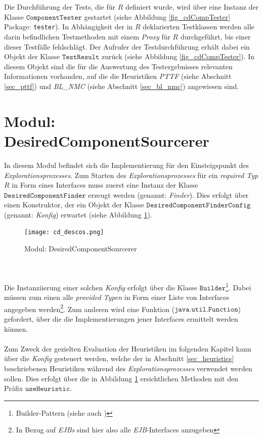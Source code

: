 \\\\
Die Durchführung der Tests, die für $R$ definiert wurde, wird über eine Instanz der Klasse $\texttt{ComponentTester}$ gestartet (siehe Abbildung \ref{fig_cdCompTester} Package: \texttt{tester}). In Abhängigkeit der in $R$ deklarierten Testklassen werden alle darin befindlichen Testmethoden mit einem \emph{Proxy} für $R$ durchgeführt, bis einer dieser Testfälle fehlschlägt. Der Aufrufer der Testdurchführung erhält dabei ein Objekt der Klasse $\texttt{TestResult}$ zurück (siehe Abbildung \ref{fig_cdCompTester}). In diesem Objekt sind die für die Auswertung des Testergebnisses relevanten Informationen vorhanden, auf die die Heuristiken \emph{PTTF} (siehe Abschnitt \ref{sec_pttf}) und \emph{BL\_NMC} (siehe Abschnitt \ref{sec_bl_nmc}) angewiesen sind.
\section{Modul: DesiredComponentSourcerer}\label{sec_impl_descos}
In diesem \Gls{Modul} befindet sich die Implementierung für den Einsteigspunkt des \emph{Explorationsprozesses}. Zum Starten des \emph{Explorationsprozesses} für ein \emph{required Typ} $R$ in Form eines \Gls{Interface}s muss zuerst eine Instanz der Klasse $\texttt{DesiredComponentFinder}$ erzeugt werden (genannt: \emph{Finder}). Dies erfolgt über einen Konstruktor, der ein Objekt der Klasse \linebreak$\texttt{DesiredComponentFinderConfig}$ (genannt: \emph{Konfig}) erwartet (siehe Abbildung \ref{cd_descos}). 
\begin{figure}[h!]
\centering
\texttt{[image: cd\_descos.png]}
\caption{Modul: DesiredComponentSourcerer}
\label{cd_descos}
\end{figure}
\noindent
\\\\
Die Instanziierung einer solchen \emph{Konfig} erfolgt über die Klasse $\texttt{Builder}$\footnote{Builder-Pattern (siehe auch \cite{patterns})}. Dabei müssen zum einen alle  \emph{provided Typen} in Form einer Liste von \Gls{Interface}s angegeben werden\footnote{In Bezug auf \emph{EJBs} sind hier also alle \emph{EJB}-\Gls{Interface}s anzugeben}. Zum anderen wird eine Funktion ($\texttt{java.util.Function}$) gefordert, über die die Implementierungen jener \Gls{Interface}s ermittelt werden können.
\\\\
Zum Zweck der gezielten Evaluation der Heuristiken im folgenden Kapitel kann über die \emph{Konfig} gesteuert werden, welche der in Abschnitt \ref{sec_heuristics} beschriebenen Heuristiken während des \emph{Explorationsprozesses} verwendet werden sollen. Dies erfolgt über die in Abbildung \ref{cd_descos} ersichtlichen Methoden mit den Präfix $\texttt{useHeuristic}$.
